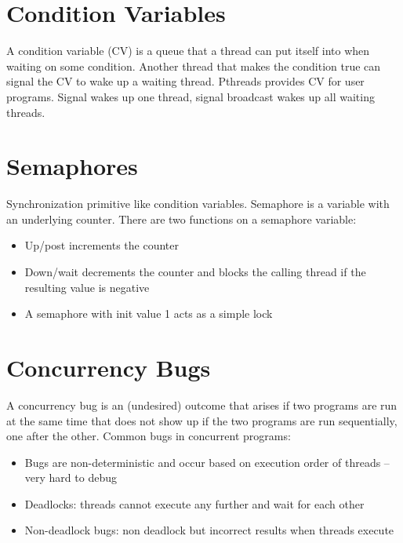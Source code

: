 \documentclass{article}
\begin{document}
\section{Condition Variables}
A condition variable (CV) is a queue that a thread can put itself into when waiting on some condition. Another thread that makes the condition true can signal the CV to wake up a waiting thread. Pthreads provides CV for user programs. Signal wakes up one thread, signal broadcast wakes up all waiting threads.
\section{Semaphores}
Synchronization primitive like condition variables. Semaphore is a variable with an underlying counter. There are two functions on a semaphore variable:
\begin{itemize}
    \item Up/post increments the counter
    \item Down/wait decrements the counter and blocks the calling thread if the resulting value is negative
    \item A semaphore with init value 1 acts as a simple lock
\end{itemize}
\section{Concurrency Bugs}
A concurrency bug is an (undesired) outcome that arises if two programs are run at the same time that does not show up if the two programs are run sequentially, one after the other. Common bugs in concurrent programs:
\begin{itemize}
    \item Bugs are non-deterministic and occur based on execution order of threads – very hard to debug
    \item Deadlocks: threads cannot execute any further and wait for each other
    \item Non-deadlock bugs: non deadlock but incorrect results when threads execute
\end{itemize}
\end{document}
